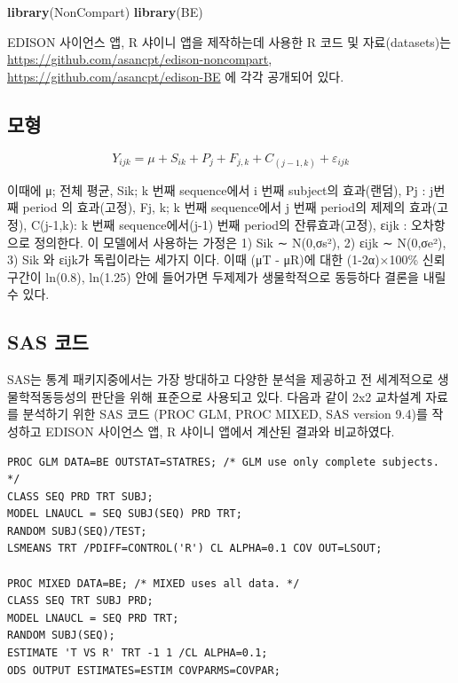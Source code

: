 \documentclass[
  10pt,
]{krantz}
\makeatletter
\newenvironment{Shaded}{\begin{snugshade}}{\end{snugshade}}
\newcommand{\KeywordTok}[1]{\textcolor[rgb]{0.13,0.29,0.53}{\textbf{#1}}}
\newcommand{\NormalTok}[1]{#1}
\newenvironment{kframe}{%
\medskip{}
\setlength{\fboxsep}{.8em}
 \def\at@end@of@kframe{}%
 \ifinner\ifhmode%
  \def\at@end@of@kframe{\end{minipage}}%
  \begin{minipage}{\columnwidth}%
 \fi\fi%
 \def\FrameCommand##1{\hskip\@totalleftmargin \hskip-\fboxsep
 \colorbox{shadecolor}{##1}\hskip-\fboxsep
     \hskip-\linewidth \hskip-\@totalleftmargin \hskip\columnwidth}%
 \MakeFramed {\advance\hsize-\width
   \@totalleftmargin\z@ \linewidth\hsize
   \@setminipage}}%
 {\par\unskip\endMakeFramed%
 \at@end@of@kframe}
\renewenvironment{Shaded}{\begin{kframe}}{\end{kframe}}
\makeatother
\begin{document}
\begin{Shaded}
\begin{Highlighting}[]
\KeywordTok{library}\NormalTok{(NonCompart)}
\KeywordTok{library}\NormalTok{(BE)}
\end{Highlighting}
\end{Shaded}

EDISON 사이언스 앱, R 샤이니 앱을 제작하는데 사용한 R 코드 및 자료(datasets)는 \url{https://github.com/asancpt/edison-noncompart}, \url{https://github.com/asancpt/edison-BE} 에 각각 공개되어 있다.

\hypertarget{uxbaa8uxd615}{%
\subsection{모형}\label{uxbaa8uxd615}}

\[
Y_{ijk} = \mu + S_{ik} + P_{j} + F_{j,k} + C_{(j-1,k)} + \varepsilon_{ijk}
\]

이때에 μ; 전체 평균, Sik; k 번째 sequence에서 i 번째 subject의 효과(랜덤), Pj : j번째 period 의 효과(고정), Fj, k; k 번째 sequence에서 j 번째 period의 제제의 효과(고정), C(j-1,k): k 번째 sequence에서(j-1) 번째 period의 잔류효과(고정), εijk : 오차항으로 정의한다. 이 모델에서 사용하는 가정은 1) Sik ∼ N(0,σs²), 2) εijk ∼ N(0,σe²), 3) Sik 와 εijk가 독립이라는 세가지 이다. 이때 (μT - μR)에 대한 (1-2α)×100\% 신뢰구간이 ln(0.8), ln(1.25) 안에 들어가면 두제제가 생물학적으로 동등하다 결론을 내릴 수 있다.

\hypertarget{sas-uxcf54uxb4dc}{%
\subsection{SAS 코드}\label{sas-uxcf54uxb4dc}}

SAS는 통계 패키지중에서는 가장 방대하고 다양한 분석을 제공하고 전 세계적으로 생물학적동등성의 판단을 위해 표준으로 사용되고 있다. 다음과 같이 2x2 교차설계 자료를 분석하기 위한 SAS 코드 (PROC GLM, PROC MIXED, SAS version 9.4)를 작성하고 EDISON 사이언스 앱, R 샤이니 앱에서 계산된 결과와 비교하였다.

\begin{verbatim}
PROC GLM DATA=BE OUTSTAT=STATRES; /* GLM use only complete subjects. */
CLASS SEQ PRD TRT SUBJ;
MODEL LNAUCL = SEQ SUBJ(SEQ) PRD TRT;
RANDOM SUBJ(SEQ)/TEST;
LSMEANS TRT /PDIFF=CONTROL('R') CL ALPHA=0.1 COV OUT=LSOUT;

PROC MIXED DATA=BE; /* MIXED uses all data. */
CLASS SEQ TRT SUBJ PRD;
MODEL LNAUCL = SEQ PRD TRT;
RANDOM SUBJ(SEQ);
ESTIMATE 'T VS R' TRT -1 1 /CL ALPHA=0.1;
ODS OUTPUT ESTIMATES=ESTIM COVPARMS=COVPAR;
\end{verbatim}
\end{document}
